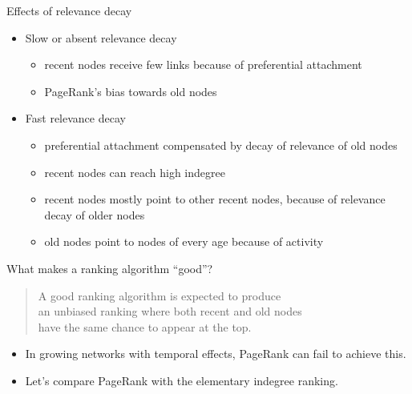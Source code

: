 \begin{frame}{Effects of relevance decay}
\begin{itemize}
    \item \alert{Slow} or absent relevance decay
    \begin{itemize}
        \item recent nodes receive few links because of preferential attachment
        \item PageRank's bias towards old nodes
    \end{itemize}
    \item \alert{Fast} relevance decay
    \begin{itemize}
        \item preferential attachment compensated by decay of relevance of old nodes
        \item recent nodes can reach high indegree
        \item recent nodes mostly point to other recent nodes, because of relevance decay of older nodes
        \item old nodes point to nodes of every age because of activity
    \end{itemize}
\end{itemize}
\end{frame}

\begin{frame}{What makes a ranking algorithm ``good''?}
    \begin{quote}
        A good ranking algorithm is expected to produce \\ an unbiased ranking where both \alert{recent} and \alert{old} nodes \\ have \alert{the same chance to appear at the top}.
    \end{quote}
    \begin{itemize}
        \item In growing networks with temporal effects, \alert{PageRank can fail} to achieve this.
        \item Let's compare PageRank with the elementary \alert{indegree ranking}.
    \end{itemize}
\end{frame}

